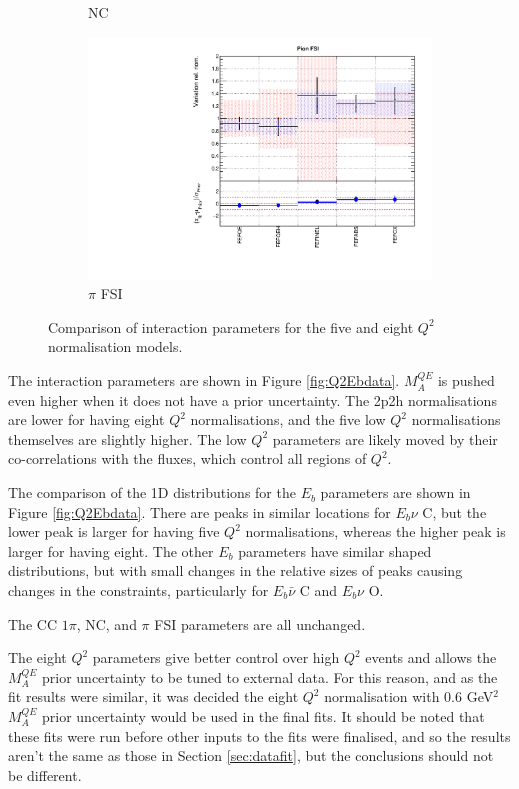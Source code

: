 \begin{figure}
\begin{subfigure}{0.49\textwidth}
  \caption{NC}
\end{subfigure}
\begin{subfigure}{0.49\textwidth}
  \centering
  \includegraphics[width=0.9\linewidth]{figs/comp5q2vs8q2xsec5}
  \caption{$\pi$ FSI}
\end{subfigure}
\caption{Comparison of interaction parameters for the five and eight $Q^2$ normalisation models.}
\label{fig:comp5q2vs8q2xsec}
\end{figure}

The interaction parameters are shown in Figure \ref{fig:Q2Ebdata}. $M_{A}^{QE}$ is pushed even higher when it does not have a prior uncertainty. The 2p2h normalisations are lower for having eight $Q^2$ normalisations, and the five low $Q^2$ normalisations themselves are slightly higher. The low $Q^2$ parameters are likely moved by their co-correlations with the fluxes, which control all regions of $Q^2$.

The comparison of the 1D distributions for the $E_b$ parameters are shown in Figure \ref{fig:Q2Ebdata}. There are peaks in similar locations for $E_b \nu$ C, but the lower peak is larger for having five $Q^2$ normalisations, whereas the higher peak is larger for having eight. The other $E_b$ parameters have similar shaped distributions, but with small changes in the relative sizes of peaks causing changes in the constraints, particularly for $E_b \bar{\nu}$ C and $E_b \nu$ O.

The CC $1\pi$, NC, and $\pi$ FSI parameters are all unchanged.

The eight $Q^2$ parameters give better control over high $Q^2$ events and allows the $M_{A}^{QE}$ prior uncertainty to be tuned to external data. For this reason, and as the fit results were similar, it was decided the eight $Q^2$ normalisation with 0.6 GeV$^2$ $M_{A}^{QE}$ prior uncertainty would be used in the final fits. It should be noted that these fits were run before other inputs to the fits were finalised, and so the results aren't the same as those in Section \ref{sec:datafit}, but the conclusions should not be different.

